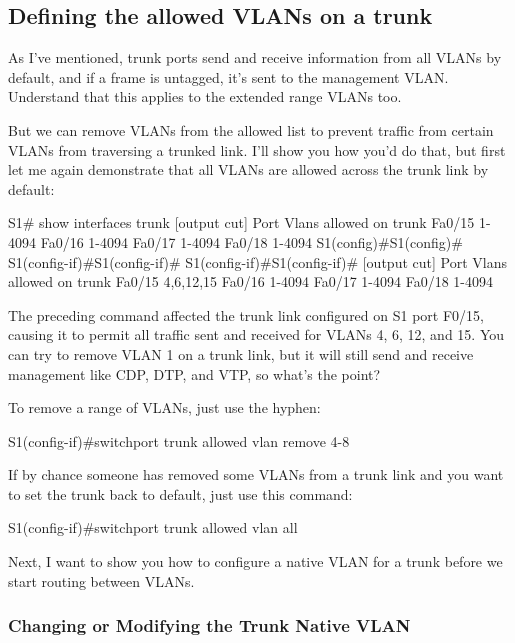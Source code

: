 \subsection{Defining the allowed VLANs on a trunk}

As I've mentioned, trunk ports send and receive information from all
VLANs by default, and if a frame is untagged, it's sent to the
management VLAN. Understand that this applies to the extended range
VLANs too.

But we can remove VLANs from the allowed list to prevent traffic from
certain VLANs from traversing a trunked link. I'll show you how you'd do
that, but first let me again demonstrate that all VLANs are allowed
across the trunk link by default:

\begin{cli}
S1# show interfaces trunk
[output cut]
Port        Vlans allowed on trunk
Fa0/15      1-4094
Fa0/16      1-4094
Fa0/17      1-4094
Fa0/18      1-4094
S1(config)#S1(config)#
S1(config-if)#S1(config-if)#
S1(config-if)#S1(config-if)#
[output cut]
Port        Vlans allowed on trunk
Fa0/15      4,6,12,15
Fa0/16      1-4094
Fa0/17      1-4094
Fa0/18      1-4094
\end{cli}

The preceding command affected the trunk link configured on S1 port
F0/15, causing it to permit all traffic sent and received for VLANs 4,
6, 12, and 15. You can try to remove VLAN 1 on a trunk link, but it will
still send and receive management like CDP, DTP, and VTP, so what's the
point?

To remove a range of VLANs, just use the hyphen:

\begin{cli}
S1(config-if)#switchport trunk allowed vlan remove 4-8
\end{cli}

If by chance someone has removed some VLANs from a trunk link and you
want to set the trunk back to default, just use this command:

\begin{cli}
S1(config-if)#switchport trunk allowed vlan all
\end{cli}

Next, I want to show you how to configure a native VLAN for a trunk
before we start routing between VLANs.

\subsubsection[Changing or Modifying the Trunk Native
VLAN]{\texorpdfstring{\protect\hypertarget{c11.xhtmlux5cux23c11-sec-13}{}{}Changing
or Modifying the Trunk Native
VLAN}{Changing or Modifying the Trunk Native VLAN}}

